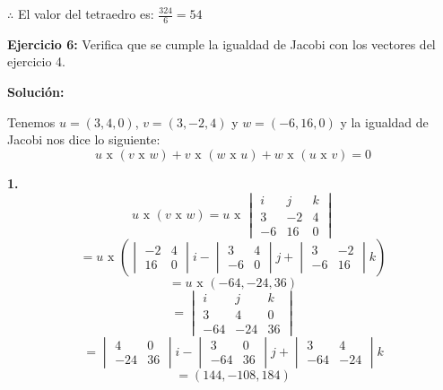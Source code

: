 \documentclass{article}
\begin{document}
$\therefore$ El valor del tetraedro es: $\frac{324}{6} = 54$

\vspace*{10pt}

\textbf{Ejercicio 6:} Verifica que se cumple la igualdad de Jacobi con los vectores del ejercicio 4.
\vspace{10pt}

\textbf{Solución:}
\vspace*{10pt}

Tenemos $u =(3, 4,0)$, $v = (3, -2,4)$ y $w = (-6, 16, 0)$ y la igualdad de Jacobi nos dice lo siguiente:
$$u \text{ x }(v \text{ x } w) + v \text{ x }(w \text{ x } u) + w \text{ x }(u \text{ x } v) = 0$$

    \textbf{1.}
    $$u \text{ x }(v \text{ x } w) = u \text{ x } \begin{vmatrix}
        i & j & k \\
        3 &-2& 4 \\
        -6& 16 & 0
    \end{vmatrix}$$ 
    $$= u \text{ x }\left(\begin{vmatrix}
        -2 & 4 \\
        16 & 0
    \end{vmatrix}i - \begin{vmatrix}
        3 & 4 \\
        -6 & 0
    \end{vmatrix}j + \begin{vmatrix}
        3 & -2 \\
        -6 & 16 
    \end{vmatrix}k\right)$$
    $$= u \text{ x }(-64, -24, 36)$$
    $$=\begin{vmatrix}
        i & j & k \\
        3 & 4 & 0 \\
        -64 & -24 & 36
    \end{vmatrix}$$
    $$ = \begin{vmatrix}
        4 & 0 \\
        -24 & 36
    \end{vmatrix}i - \begin{vmatrix}
        3 & 0 \\
        -64 & 36
    \end{vmatrix}j + \begin{vmatrix}
        3 & 4 \\
        -64 & -24
    \end{vmatrix}k$$
    $$=(144, -108, 184)$$
\end{document}
